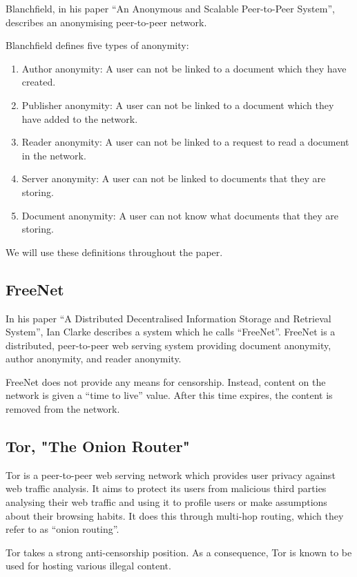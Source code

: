\documentclass{article}
\begin{document}
Blanchfield, in his paper “An Anonymous and Scalable Peer-to-Peer System”, describes an anonymising peer-to-peer network.

Blanchfield defines five types of anonymity:

\begin{enumerate}
    \item{Author anonymity: A user can not be linked to a document which they have created.}
    \item{Publisher anonymity: A user can not be linked to a document which they have added to the network.}
    \item{Reader anonymity: A user can not be linked to a request to read a document in the network.}
    \item{Server anonymity: A user can not be linked to documents that they are storing.}
    \item{Document anonymity: A user can not know what documents that they are storing.}
\end{enumerate}

We will use these definitions throughout the paper.

\subsection{FreeNet}

In his paper “A Distributed Decentralised Information Storage and Retrieval System”, Ian Clarke describes a system which he calls “FreeNet”. FreeNet is a distributed, peer-to-peer web serving system providing document anonymity, author anonymity, and reader anonymity.

FreeNet does not provide any means for censorship. Instead, content on the network is given a “time to live” value. After this time expires, the content is removed from the network. 

\subsection{Tor, "The Onion Router"}

Tor is a peer-to-peer web serving network which provides user privacy against web traffic analysis. It aims to protect its users from malicious third parties analysing their web traffic and using it to profile users or make assumptions about their browsing habits. It does this through multi-hop routing, which they refer to as “onion routing”.

Tor takes a strong anti-censorship position. As a consequence, Tor is known to be used for hosting various illegal content. 
\end{document}
